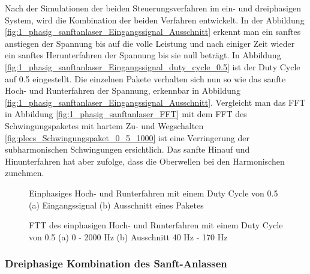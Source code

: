 Nach der Simulationen der beiden Steuerungsverfahren im ein- und dreiphasigen System, wird die Kombination der beiden Verfahren entwickelt. In der Abbildung \ref{fig:1_phasig_sanftanlaser_Eingangssignal_Ausschnitt} erkennt man ein sanftes anstiegen der Spannung bis auf die volle Leistung und nach einiger Zeit wieder ein sanftes Herunterfahren der Spannung bis sie null beträgt. In Abbildung \ref{fig:1_phasig_sanftanlaser_Eingangssignal_duty_cycle_0.5} ist der Duty Cycle auf 0.5 eingestellt. Die einzelnen Pakete verhalten sich nun so wie das sanfte Hoch- und Runterfahren der Spannung, erkennbar in Abbildung \ref{fig:1_phasig_sanftanlaser_Eingangssignal_Ausschnitt}. Vergleicht man das FFT in Abbildung \ref{fig:1_phasig_sanftanlaser_FFT} mit dem FFT des Schwingungspaketes mit hartem Zu- und Wegschalten \ref{fig:plecs_Schwingungspaket_0_5_1000} ist eine Verringerung der subharmonischen Schwingungen ersichtlich. Das sanfte Hinauf und Hinunterfahren hat aber zufolge, dass die Oberwellen bei den Harmonischen zunehmen. 

\begin{figure}[ht!]
	\centering
	\qquad
	\caption{Einphasiges Hoch- und Runterfahren mit einem Duty Cycle von 0.5 (a) Eingangssignal (b) Ausschnitt eines Paketes}
	\label{fig:einphasiges_Sanft_anlassen_Einganssignal}
\end{figure}

\begin{figure}[ht!]
	\centering
	\qquad
	\caption{FTT des einphasigen Hoch- und Runterfahren mit einem Duty Cycle von 0.5 (a) 0 - 2000 Hz (b) Ausschnitt 40 Hz - 170 Hz}
	\label{fig:einphasiges_Sanft_anlassen_FTT}
\end{figure}

\subsubsection{Dreiphasige Kombination des Sanft-Anlassen}

